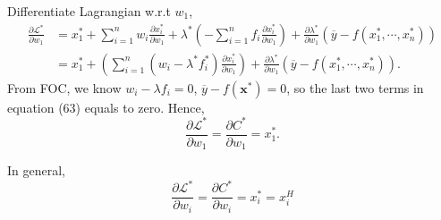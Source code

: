 \documentclass[12pt]{article}
\begin{document}
Differentiate Lagrangian w.r.t $ w_1 $,
\begin{align}
				\frac{\partial \mathscr{L}^{*} }{\partial w_1 } &= 
				x_1^{*} + \sum\limits_{i = 1} ^n w_{i}\frac{\partial x_{i}^{*} }
				{\partial w_1 }	 + \lambda ^{*}\left( 
				-\sum\limits_{i = 1} ^n f_{i}\frac{\partial x_{i}^{*} }
        {\partial w_{1} }	\right)  + \frac{\partial \lambda ^{*} }
				{\partial w_1 }(\overline{y} - f(x_1^{*}, \cdots, x_{n}^{*}))\\
				&= x_1^{*} + \left(\sum\limits_{i = 1} ^n (w_{i} -
				\lambda ^{*}f^{*}_{i})\frac{\partial x_{i}^{*} }{\partial w_1 }\right)
				+ \frac{\partial \lambda ^{*} }{\partial w_1 }(\overline{y} - 
				f(x_1^{*},\cdots,x_{n}^{*})).
\end{align}
From FOC, we know $ w_{i} - \lambda f_{i} = 0 $, $ \overline{y} - f(\bm{x}^{*})
=0$, so the last two terms in equation (63) equals to zero.
Hence, 
\begin{equation}
				\frac{\partial \mathscr{L}^{*} }{\partial w_1 } = 
				\frac{\partial C^{*} }{\partial w_1 } = x_1^{*}.
\end{equation}


In general, 
\begin{equation}
				\frac{\partial \mathscr{L}^{*} }{\partial w_{i} } =
				\frac{\partial C^{*} }{\partial w_{i} } = x_{i}^{*} = x_{i}^{H}
\end{equation}
\end{document}
